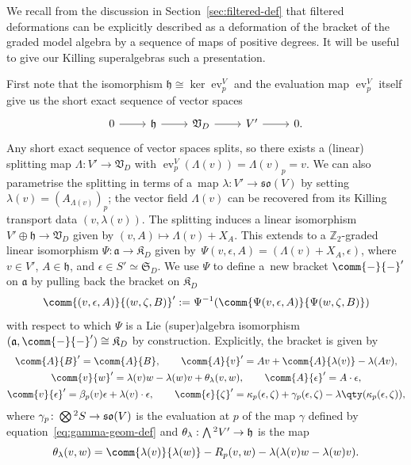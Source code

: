 \documentclass[pdftex]{sigma}
\numberwithin{equation}{section}
\newcommand{\fa}{\mathfrak{a}}
\newcommand{\fh}{\mathfrak{h}}
\newcommand{\fso}{\mathfrak{so}}
\newcommand{\fK}{\mathfrak{K}}
\newcommand{\fS}{\mathfrak{S}}
\newcommand{\fV}{\mathfrak{V}}
\newcommand{\ZZ}{\mathbb{Z}}
\newcommand{\Wedge}{\mathchoice{{\textstyle\bigwedge}}{\bigwedge}{\bigwedge}{\bigwedge}}	%
\newcommand{\Otimes}{\mathchoice{{\textstyle\bigotimes}}{\bigotimes}{\bigotimes}{\bigotimes}}
\newcommand{\1}{\mathbbm{1}}
\DeclareMathOperator{\evaluate}{ev}
\begin{document}
We recall from the discussion in Section~\ref{sec:filtered-def} that filtered deformations can be explicitly described as a deformation of the bracket of the graded model algebra by a sequence of maps of positive degrees. It will be useful to give our Killing superalgebras such a presentation.

First note that the isomorphism $\fh\cong\ker\evaluate^V_p$ and the evaluation map $\evaluate^V_p$ itself give us the short exact sequence of vector spaces
\[
\begin{tikzcd}
	0 \ar[r] & \fh \ar[r] & \fV_D \ar[r] & V' \ar[r] & 0.
\end{tikzcd}
\]
Any short exact sequence of vector spaces splits, so there exists a (linear) splitting map $\Lambda\colon V'\to \fV_D$ with $\evaluate^V_p(\Lambda(v))=\Lambda(v)_p=v$. We can also parametrise the splitting in terms of a~map $\lambda\colon V'\to \fso(V)$ by setting $\lambda(v)=(A_{\Lambda(v)})_p$; the vector field $\Lambda(v)$ can be recovered from its Killing transport data $(v,\lambda(v))$. The splitting induces a linear isomorphism $V'\oplus\fh\to\fV_D$ given by $(v,A)\mapsto \Lambda(v)+X_A$.
This extends to a $\ZZ_2$-graded linear isomorphism $\Psi\colon \fa \to \fK_D$ given by~${\Psi(v,\epsilon,A) = (\Lambda(v)+X_A,\epsilon)}$,
where $v\in V'$, $A\in\fh$, and $\epsilon\in S'\simeq\fS_D$.
We use $\Psi$ to define a~new bracket $\comm{-}{-}'$ on $\fa$ by pulling back the bracket on $\fK_D$
\[
	\comm{(v,\epsilon,A)}{(w,\zeta,B)}'
		:= \Psi^{-1}(\comm{\Psi(v,\epsilon,A)}{\Psi(w,\zeta,B)})
\]
with respect to which $\Psi$ is a Lie (super)algebra isomorphism $(\fa,\comm{-}{-}')\cong\fK_D$ by construction. Explicitly, the bracket is given by
\begin{gather}
	\comm{A}{B}' = \comm{A}{B},\qquad
	 \comm{A}{v}' = Av + \comm{A}{\lambda(v)}-\lambda(Av),\nonumber	\\
	\comm{v}{w}' = \lambda(v)w-\lambda(w)v + \theta_\lambda(v,w),\qquad
	\comm{A}{\epsilon}' = A\cdot\epsilon,\nonumber	\\
	 \comm{v}{\epsilon}' = \beta_p(v)\epsilon + \lambda(v)\cdot \epsilon,	\qquad
	\comm{\epsilon}{\zeta}'
		 = \kappa_p(\epsilon,\zeta) + \gamma_p(\epsilon,\zeta)-\lambda\qty(\kappa_p(\epsilon,\zeta)),\label{eq:KSA-deformed-brackets}
\end{gather}
where $\gamma_p\colon\Otimes^2S\to\fso(V)$ is the evaluation at $p$ of the map $\gamma$ defined by equation~\eqref{eq:gamma-geom-def} and $\theta_\lambda:\Wedge^2V'\to \fh$ is the map
\[
	\theta_\lambda(v,w)
		= \comm{\lambda(v)}{\lambda(w)} - R_p(v,w) - \lambda(\lambda(v)w-\lambda(w)v).
\]
\end{document}
